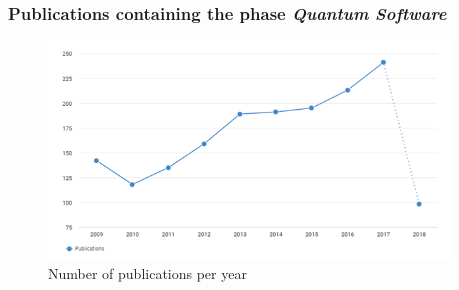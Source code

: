 \documentclass{beamer}
\begin{document}
\begin{frame}
	\frametitle{Publications containing the phase \textit{Quantum Software}}
\begin{figure}[H]
	\centering
	\includegraphics[width=0.95\textwidth]{qsoftwaretrend.png}
	\caption{Number of publications per year \footnotemark} 
	\label{}
\end{figure}
\end{frame}
\end{document}

